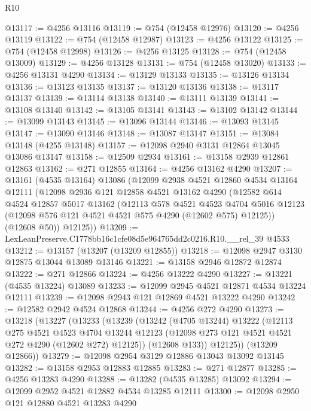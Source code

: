 \begin{lexlean}{R10}
\begin{coremodule}
@13117 := @4256 @13116
@13119 := @754 (@12458 @12976)
@13120 := @4256 @13119
@13122 := @754 (@12458 @12987)
@13123 := @4256 @13122
@13125 := @754 (@12458 @12998)
@13126 := @4256 @13125
@13128 := @754 (@12458 @13009)
@13129 := @4256 @13128
@13131 := @754 (@12458 @13020)
@13133 := @4256 @13131 @4290
@13134 := @13129 @13133
@13135 := @13126 @13134
@13136 := @13123 @13135
@13137 := @13120 @13136
@13138 := @13117 @13137
@13139 := @13114 @13138
@13140 := @13111 @13139
@13141 := @13108 @13140
@13142 := @13105 @13141
@13143 := @13102 @13142
@13144 := @13099 @13143
@13145 := @13096 @13144
@13146 := @13093 @13145
@13147 := @13090 @13146
@13148 := @13087 @13147
@13151 := @13084 @13148 (@4255 @13148)
@13157 := @12098 @2940 @3131 @12864 @13045 @13086 @13147
@13158 := @12509 @2934
@13161 := @13158 @2939 @12861 @12863
@13162 := @271 @12855
@13164 := @4256 @13162 @4290
@13207 := @13161
    (@4535 @13164)
    @13086
    (@12099
      @2938
      @4521
      @12860
      @4534
      @13164
      @12111
      (@12098
        @2936
        @121
        @12858
        @4521
        @13162
        @4290
        (@12582
          @614
          @4524
          @12857
          @5017
          @13162
          (@12113
            @578
            @4521
            @4523
            @4704
            @5016
            @12123
            (@12098 @576 @121 @4521 @4521 @575 @4290 (@12602 @575) @12125))
          (@12608 @50))
        @12125))
@13209 := LexLeanPreserve.C1778bb16c1cfe08d5e964765dd2c0216.R10.__rel_39 @4533
@13212 := @13157 (@13207 (@13209 @12855))
@13218 := @12098 @2947 @3130 @12875 @13044 @13089 @13146
@13221 := @13158 @2946 @12872 @12874
@13222 := @271 @12866
@13224 := @4256 @13222 @4290
@13227 := @13221 (@4535 @13224) @13089
@13233 := @12099 @2945 @4521 @12871 @4534 @13224 @12111
@13239 := @12098 @2943 @121 @12869 @4521 @13222 @4290
@13242 := @12582 @2942 @4524 @12868
@13244 := @4256 @272 @4290
@13273 := @13218
    (@13227
      (@13233
        (@13239
          (@13242
            (@4705 @13244)
            @13222
            (@12113
              @275
              @4521
              @4523
              @4704
              @13244
              @12123
              (@12098 @273 @121 @4521 @4521 @272 @4290 (@12602 @272) @12125))
            (@12608 @133))
          @12125))
      (@13209 @12866))
@13279 := @12098 @2954 @3129 @12886 @13043 @13092 @13145
@13282 := @13158 @2953 @12883 @12885
@13283 := @271 @12877
@13285 := @4256 @13283 @4290
@13288 := @13282 (@4535 @13285) @13092
@13294 := @12099 @2952 @4521 @12882 @4534 @13285 @12111
@13300 := @12098 @2950 @121 @12880 @4521 @13283 @4290

\end{coremodule}
\end{lexlean}
